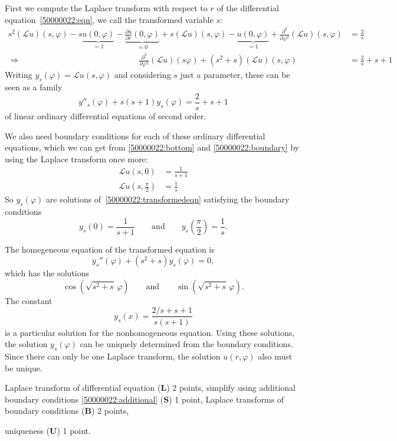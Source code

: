 \begin{loesung}
\begin{teilaufgaben}
\item
First we compute the Laplace transform with respect to $r$ of the
differential equation~\eqref{50000022:eqn}, we call the transformed variable
$s$:
\begin{align*}
s^2 (\mathcal{L}u)(s,\varphi)
   -s \underbrace{u(0,\varphi)}_{\textstyle=1}
   -\underbrace{\frac{\partial u}{\partial r}(0,\varphi)}_{\textstyle=0}
+s(\mathcal{L}u)(s,\varphi) - \underbrace{u(0,\varphi)}_{\textstyle=1}
+
\frac{\partial^2}{\partial\varphi^2}(\mathcal{L}u)(s,\varphi)
&=
\frac2s
\\
\Rightarrow\hspace{6cm}
\frac{\partial^2}{\partial\varphi^2}(\mathcal{L}u)(s\varphi)
+
(s^2+s) (\mathcal{L}u)(s,\varphi)
&=
\frac2s
+s+1
\end{align*}
Writing $y_s(\varphi)=\mathcal{L}u(s,\varphi)$ and considering
$s$ just a parameter, these can be seen as a family
\begin{equation}
y''_s(\varphi) +s(s+1) y_s(\varphi) = \frac{2}s+s+1
\label{50000022:transformedeqn}
\end{equation}
of linear ordinary
differential equations of second order.

We also need boundary conditions for each of these ordinary differential
equations, which we can get from \eqref{50000022:bottom} and
\eqref{50000022:boundary} by using the Laplace transform once more:
\begin{align*}
\mathcal{L}u(s,0) &= \frac{1}{s+1}
\\
\mathcal{L}u(s,{\textstyle\frac{\pi}2}) &= \frac1s
\end{align*}
So $y_s(\varphi)$ are solutions of~\eqref{50000022:transformedeqn}
satisfying the boundary conditions
\[
y_s(0)=\frac{1}{s+1}
\qquad\text{and}\qquad
y_s({\textstyle\frac{\pi}2})=\frac{1}s.
\]
\item
The homegeneous equation of the transformed equation is
\[
y_s''(\varphi) + (s^2+s) y_s(\varphi)=0,
\]
which has the solutions
\[
\cos(\!\sqrt{s^2+s}\,\varphi)
\qquad\text{and}\qquad
\sin(\!\sqrt{s^2+s}\,\varphi).
\]
The constant
\[
y_s(x) = \frac{2/s+s+1}{s(s+1)}
\]
is a particular solution for the nonhomogeneous equation.
Using these solutions, the solution $y_s(\varphi)$ can be uniquely determined
from the boundary conditions.
Since there can only be one Laplace transform, the solution $u(r,\varphi)$
also must be unique.
\qedhere
\end{teilaufgaben}
\end{loesung}

\begin{bewertung}
\begin{teilaufgaben}
\item
Laplace transform of differential equation ({\bf L}) 2 points,
simplify using additional boundary conditions \eqref{50000022:additional}
({\bf S}) 1 point,
Laplace transforms of boundary conditions ({\bf B}) 2 points,
\item
uniqueness ({\bf U}) 1 point.
\end{teilaufgaben}
\end{bewertung}

